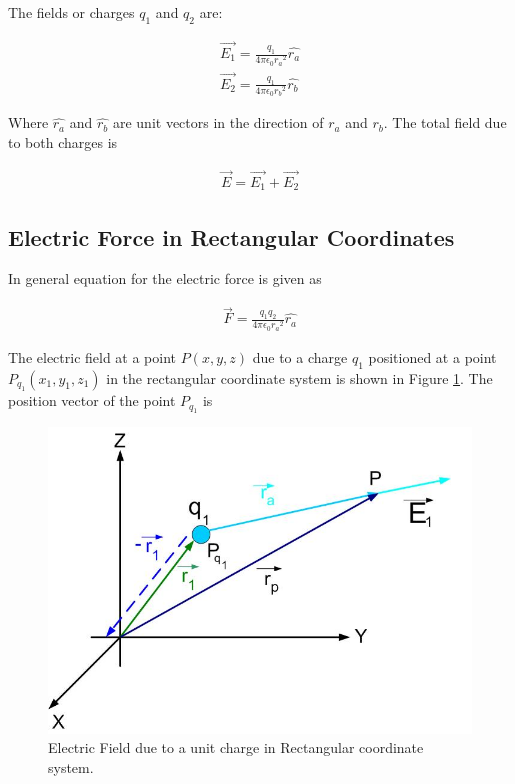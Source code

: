 \documentclass{ximera}
\begin{document}
The fields or charges $q_1$ and $q_2$ are:

\begin{eqnarray}
\vec{E_1}=\frac{q_1}{4 \pi \epsilon_{0} {r_a}^2} \hat{r_a} \label{field}\\
\vec{E_2}=\frac{q_1}{4 \pi \epsilon_{0} {r_b}^2} \hat{r_b}
\end{eqnarray}

Where $\hat{r_a}$ and $\hat{r_b}$ are unit vectors in the direction of $r_a$ and $r_b$. The total field due to both charges is


\begin{eqnarray}
\vec{E}=\vec{E_1} + \vec{E_2} 
\end{eqnarray}






\subsection{Electric Force in Rectangular Coordinates}


In general equation for the electric force is given as



\begin{eqnarray}
\vec{F}=\frac{q_1 q_2}{4 \pi \epsilon_{0} {r_a}^2} \hat{r_a} \label{genfield}
\end{eqnarray}

The electric field at a point $P(x,y,z)$ due to a charge $q_1$ positioned at a point $P_{q_1}(x_1, y_1, z_1 )$  in the rectangular coordinate system is shown in Figure \ref{singlecharge}. The position vector of the point $P_{q_1}$  is 


\begin{figure}[htbp]
\begin{center}
\includegraphics[scale=0.5]{../jpg/singlechargecartcoord.jpg}
\end{center}
\caption{Electric Field due to a unit charge in Rectangular coordinate system.}
\label{singlecharge}
\end{figure}
\end{document}
